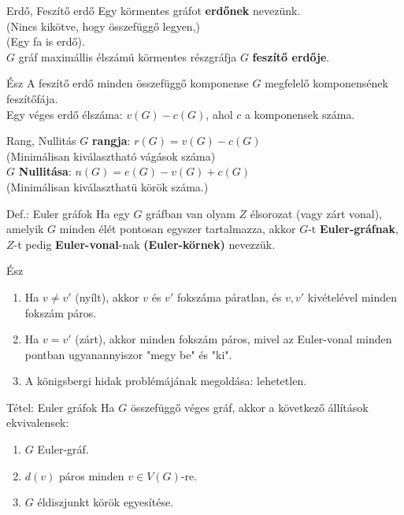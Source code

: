 \documentclass{beamer}
\begin{document}
\begin{frame}
\begin{block}{Erdő, Feszítő erdő}
Egy körmentes gráfot \textbf{erdőnek} nevezünk.\\
(Nincs kikötve, hogy összefüggő legyen,)\\
(Egy fa is erdő).\\
\medskip
$G$ gráf maximállis élszámú körmentes részgráfja $G$ \textbf{feszítő erdője}.
\end{block}

\begin{block}{Ész}
A feszítő erdő minden összefüggő komponense $G$ megfelelő komponensének feszítőfája.\\
\medskip
Egy véges erdő élszáma: $v(G) - c(G)$, ahol $c$ a komponensek száma.
\end{block}

\begin{block}{Rang, Nullitás}
$G$ \textbf{rangja}: $r(G) = v(G) - c(G)$\\
(Minimálisan kiválasztható vágások száma)\\
\medskip
$G$ \textbf{Nullitása}: $n(G) = e(G) - v(G) + c(G)$\\
(Minimálisan kiválaszthatü körök száma.)
\end{block}
\end{frame}

\begin{frame}
\begin{block}{Def.: Euler gráfok}
Ha egy $G$ gráfban van olyam $Z$ élsorozat (vagy zárt vonal), amelyik $G$ minden élét pontosan egyszer tartalmazza, akkor $G$-t \textbf{Euler-gráfnak}, $Z$-t pedig \textbf{Euler-vonal}-nak \textbf{(Euler-körnek)} nevezzük.
\end{block}
\begin{block}{Ész}
\begin{enumerate}
\item Ha $v \neq v'$ (nyílt), akkor $v$ és $v'$ fokszáma páratlan, és $v, v'$ kivételével minden fokszám páros.
\item Ha $v = v'$ (zárt), akkor minden fokszám páros, mivel az Euler-vonal minden pontban ugyanannyiszor "megy be" és "ki".
\item A königsbergi hidak problémájának megoldása: lehetetlen.
\end{enumerate}
\end{block}
\end{frame}

\begin{frame}
\begin{block}{Tétel: Euler gráfok}
Ha $G$ összefüggő véges gráf, akkor a következő állítások ekvivalensek:\\
\begin{enumerate}
\item $G$ Euler-gráf.
\item $d(v)$ páros minden $v \in V(G)$-re.
\item $G$ éldiszjunkt körök egyesítése.
\end{enumerate}
\end{block}
\end{frame}
\end{document}

